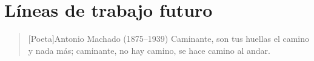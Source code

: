 \chapter{Líneas de trabajo futuro}

\begin{quotation}[Poeta]{Antonio Machado (1875--1939)}
Caminante, son tus huellas el camino y nada más; caminante, no hay camino, se hace camino al andar.
\end{quotation}

\begin{abstract}
Este capítulo recoge las líneas de trabajo que quedan abiertas tras la realización del proyecto, tanto las que surgieron de limitaciones de alcance como las que se derivan naturalmente de los resultados obtenidos.
\end{abstract}

